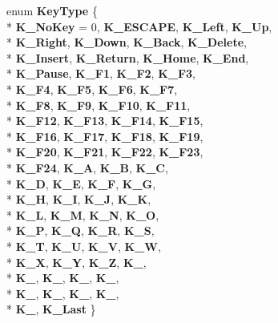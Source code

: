 \begin{DoxyCompactItemize}
\item 
\hypertarget{class_tempest_1_1_event_a5c66a7404768986697634059fef5cd93}{enum {\bfseries Key\+Type} \{ \\*
{\bfseries K\+\_\+\+No\+Key} = 0, 
{\bfseries K\+\_\+\+E\+S\+C\+A\+P\+E}, 
{\bfseries K\+\_\+\+Left}, 
{\bfseries K\+\_\+\+Up}, 
\\*
{\bfseries K\+\_\+\+Right}, 
{\bfseries K\+\_\+\+Down}, 
{\bfseries K\+\_\+\+Back}, 
{\bfseries K\+\_\+\+Delete}, 
\\*
{\bfseries K\+\_\+\+Insert}, 
{\bfseries K\+\_\+\+Return}, 
{\bfseries K\+\_\+\+Home}, 
{\bfseries K\+\_\+\+End}, 
\\*
{\bfseries K\+\_\+\+Pause}, 
{\bfseries K\+\_\+\+F1}, 
{\bfseries K\+\_\+\+F2}, 
{\bfseries K\+\_\+\+F3}, 
\\*
{\bfseries K\+\_\+\+F4}, 
{\bfseries K\+\_\+\+F5}, 
{\bfseries K\+\_\+\+F6}, 
{\bfseries K\+\_\+\+F7}, 
\\*
{\bfseries K\+\_\+\+F8}, 
{\bfseries K\+\_\+\+F9}, 
{\bfseries K\+\_\+\+F10}, 
{\bfseries K\+\_\+\+F11}, 
\\*
{\bfseries K\+\_\+\+F12}, 
{\bfseries K\+\_\+\+F13}, 
{\bfseries K\+\_\+\+F14}, 
{\bfseries K\+\_\+\+F15}, 
\\*
{\bfseries K\+\_\+\+F16}, 
{\bfseries K\+\_\+\+F17}, 
{\bfseries K\+\_\+\+F18}, 
{\bfseries K\+\_\+\+F19}, 
\\*
{\bfseries K\+\_\+\+F20}, 
{\bfseries K\+\_\+\+F21}, 
{\bfseries K\+\_\+\+F22}, 
{\bfseries K\+\_\+\+F23}, 
\\*
{\bfseries K\+\_\+\+F24}, 
{\bfseries K\+\_\+\+A}, 
{\bfseries K\+\_\+\+B}, 
{\bfseries K\+\_\+\+C}, 
\\*
{\bfseries K\+\_\+\+D}, 
{\bfseries K\+\_\+\+E}, 
{\bfseries K\+\_\+\+F}, 
{\bfseries K\+\_\+\+G}, 
\\*
{\bfseries K\+\_\+\+H}, 
{\bfseries K\+\_\+\+I}, 
{\bfseries K\+\_\+\+J}, 
{\bfseries K\+\_\+\+K}, 
\\*
{\bfseries K\+\_\+\+L}, 
{\bfseries K\+\_\+\+M}, 
{\bfseries K\+\_\+\+N}, 
{\bfseries K\+\_\+\+O}, 
\\*
{\bfseries K\+\_\+\+P}, 
{\bfseries K\+\_\+\+Q}, 
{\bfseries K\+\_\+\+R}, 
{\bfseries K\+\_\+\+S}, 
\\*
{\bfseries K\+\_\+\+T}, 
{\bfseries K\+\_\+\+U}, 
{\bfseries K\+\_\+\+V}, 
{\bfseries K\+\_\+\+W}, 
\\*
{\bfseries K\+\_\+\+X}, 
{\bfseries K\+\_\+\+Y}, 
{\bfseries K\+\_\+\+Z}, 
{\bfseries K\+\_}, 
\\*
{\bfseries K\+\_}, 
{\bfseries K\+\_}, 
{\bfseries K\+\_}, 
{\bfseries K\+\_}, 
\\*
{\bfseries K\+\_}, 
{\bfseries K\+\_}, 
{\bfseries K\+\_}, 
{\bfseries K\+\_}, 
\\*
{\bfseries K\+\_}, 
{\bfseries K\+\_\+\+Last}
 \}}\label{class_tempest_1_1_event_a5c66a7404768986697634059fef5cd93}

\end{DoxyCompactItemize}
